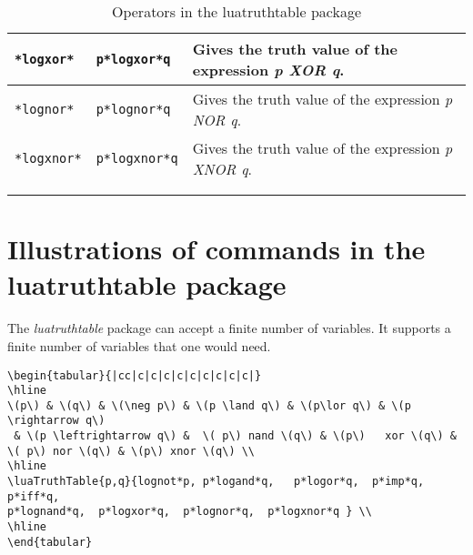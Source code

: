 \documentclass{article}
\begin{document}
\begin{center}
\begin{longtable}{llm{9cm}}
\midrule
\begin{lstlisting}[caption={[]}]
*logxor*
\end{lstlisting} &
\begin{lstlisting}[caption={[]}]
p*logxor*q
\end{lstlisting} & Gives the truth value of the expression \emph{ p XOR q}.\\
\midrule
\begin{lstlisting}[caption={[]}]
*lognor*
\end{lstlisting} &
\begin{lstlisting}[caption={[]}]
p*lognor*q
\end{lstlisting} & Gives the truth value of the expression \emph{ p NOR q}.\\
\midrule
\begin{lstlisting}[caption={[]}]
*logxnor*
\end{lstlisting} &
\begin{lstlisting}[caption={[]}]
p*logxnor*q
\end{lstlisting} & Gives the truth value of the expression \emph{ p XNOR q}.\\
\bottomrule \\
\caption{Operators in the luatruthtable package}
\label{tbl:truthop}
\end{longtable}
\end{center}

\section{Illustrations of commands in the luatruthtable package}\label{illtruth}

The \emph{luatruthtable} package can accept a finite number of variables. It supports a finite number of variables that one would need.

\begin{lstlisting}[label={code:illluatruth},  caption={LaTeX document with luatruthtable package}]
\begin{tabular}{|cc|c|c|c|c|c|c|c|c|c|}
\hline
\(p\) & \(q\) & \(\neg p\) & \(p \land q\) & \(p\lor q\) & \(p \rightarrow q\)
 & \(p \leftrightarrow q\) &  \( p\) nand \(q\) & \(p\)   xor \(q\) & \( p\) nor \(q\) & \(p\) xnor \(q\) \\
\hline
\luaTruthTable{p,q}{lognot*p, p*logand*q,   p*logor*q,  p*imp*q,  p*iff*q, 
p*lognand*q,  p*logxor*q,  p*lognor*q,  p*logxnor*q } \\
\hline
\end{tabular}
\end{lstlisting}  
\end{document}
